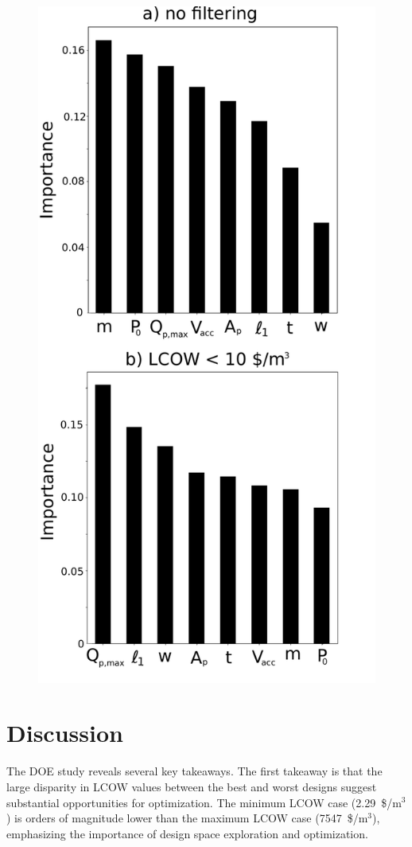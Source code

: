 \documentclass[twocolumn,10pt]{asme2e}
\begin{document}
\begin{figure}
    \centering
    \includegraphics[width=0.6\linewidth]{../figs/importance.pdf}
    \label{fig:importance}
\end{figure}

\section{Discussion}
The DOE study reveals several key takeaways. The first takeaway is that the large disparity in LCOW values between the best and worst designs suggest substantial opportunities for optimization.  The minimum LCOW case (2.29~\$/m$^3$) is orders of magnitude lower than the maximum LCOW case (7547~\$/m$^3$), emphasizing the importance of design space exploration and optimization. 
\end{document}
